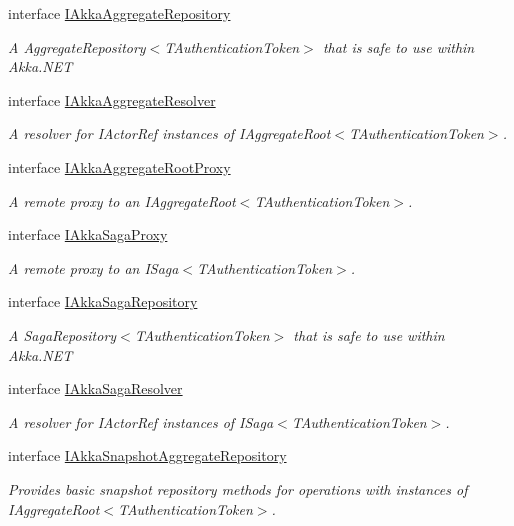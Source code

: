 \begin{DoxyCompactItemize}
interface \hyperlink{interfaceCqrs_1_1Akka_1_1Domain_1_1IAkkaAggregateRepository}{I\+Akka\+Aggregate\+Repository}
\begin{DoxyCompactList}\small\item\em A Aggregate\+Repository$<$\+T\+Authentication\+Token$>$ that is safe to use within Akka.\+N\+ET \end{DoxyCompactList}\item 
interface \hyperlink{interfaceCqrs_1_1Akka_1_1Domain_1_1IAkkaAggregateResolver}{I\+Akka\+Aggregate\+Resolver}
\begin{DoxyCompactList}\small\item\em A resolver for I\+Actor\+Ref instances of I\+Aggregate\+Root$<$\+T\+Authentication\+Token$>$. \end{DoxyCompactList}\item 
interface \hyperlink{interfaceCqrs_1_1Akka_1_1Domain_1_1IAkkaAggregateRootProxy}{I\+Akka\+Aggregate\+Root\+Proxy}
\begin{DoxyCompactList}\small\item\em A remote proxy to an I\+Aggregate\+Root$<$\+T\+Authentication\+Token$>$. \end{DoxyCompactList}\item 
interface \hyperlink{interfaceCqrs_1_1Akka_1_1Domain_1_1IAkkaSagaProxy}{I\+Akka\+Saga\+Proxy}
\begin{DoxyCompactList}\small\item\em A remote proxy to an I\+Saga$<$\+T\+Authentication\+Token$>$. \end{DoxyCompactList}\item 
interface \hyperlink{interfaceCqrs_1_1Akka_1_1Domain_1_1IAkkaSagaRepository}{I\+Akka\+Saga\+Repository}
\begin{DoxyCompactList}\small\item\em A Saga\+Repository$<$\+T\+Authentication\+Token$>$ that is safe to use within Akka.\+N\+ET \end{DoxyCompactList}\item 
interface \hyperlink{interfaceCqrs_1_1Akka_1_1Domain_1_1IAkkaSagaResolver}{I\+Akka\+Saga\+Resolver}
\begin{DoxyCompactList}\small\item\em A resolver for I\+Actor\+Ref instances of I\+Saga$<$\+T\+Authentication\+Token$>$. \end{DoxyCompactList}\item 
interface \hyperlink{interfaceCqrs_1_1Akka_1_1Domain_1_1IAkkaSnapshotAggregateRepository}{I\+Akka\+Snapshot\+Aggregate\+Repository}
\begin{DoxyCompactList}\small\item\em Provides basic snapshot repository methods for operations with instances of I\+Aggregate\+Root$<$\+T\+Authentication\+Token$>$. \end{DoxyCompactList}\end{DoxyCompactItemize}
